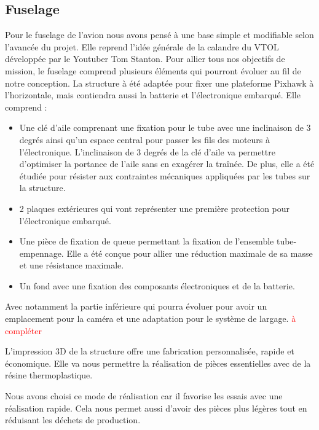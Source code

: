 \documentclass[a4paper,12pt,french]{report}
\begin{document}
\subsection{Fuselage}

Pour le fuselage de l’avion nous avons pensé à une base simple et modifiable selon l’avancée du projet. Elle reprend l’idée générale de la calandre du VTOL développée par le Youtuber Tom Stanton. Pour allier tous nos objectifs de mission, le fuselage  comprend plusieurs éléments qui pourront évoluer au fil de notre conception. La structure à été adaptée pour fixer une plateforme Pixhawk à l’horizontale, mais contiendra aussi la batterie et l’électronique embarqué. Elle comprend :

\begin{itemize}
    \item Une clé d’aile comprenant une fixation pour le tube avec une inclinaison de 3 degrés ainsi qu’un espace central pour  passer les fils des moteurs à l'électronique. L'inclinaison de 3 degrés de la clé d'aile va permettre d’optimiser la portance de l’aile sans en exagérer la traînée. De plus, elle a été étudiée pour résister aux contraintes mécaniques appliquées par les tubes sur la structure.
    \item 2 plaques extérieures qui vont représenter une première protection pour l’électronique embarqué.
    \item Une pièce de fixation de queue permettant la fixation de l’ensemble tube-empennage. Elle a été conçue pour allier une réduction maximale de sa masse et une résistance maximale.
    \item Un fond avec une fixation des composants électroniques et de la batterie.
\end{itemize}

Avec notamment la partie inférieure qui pourra évoluer pour avoir un emplacement pour la caméra et une adaptation pour le système de largage.
\textcolor{red}{à compléter}\newline

L'impression 3D de la structure offre une fabrication personnalisée, rapide et économique. Elle va nous permettre la réalisation de pièces essentielles avec de la résine thermoplastique.

Nous avons choisi ce mode de réalisation car il favorise les essais avec une réalisation rapide. Cela nous permet aussi d’avoir des pièces plus légères tout en réduisant les déchets de production.\newline
\end{document}
